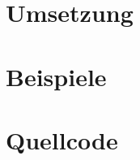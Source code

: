 \documentclass[a4paper,10pt,ngerman]{scrartcl}
\begin{document}
\section{Umsetzung}\label{sec:umsetzung}

\section{Beispiele}










\section{Quellcode}

\end{document}
